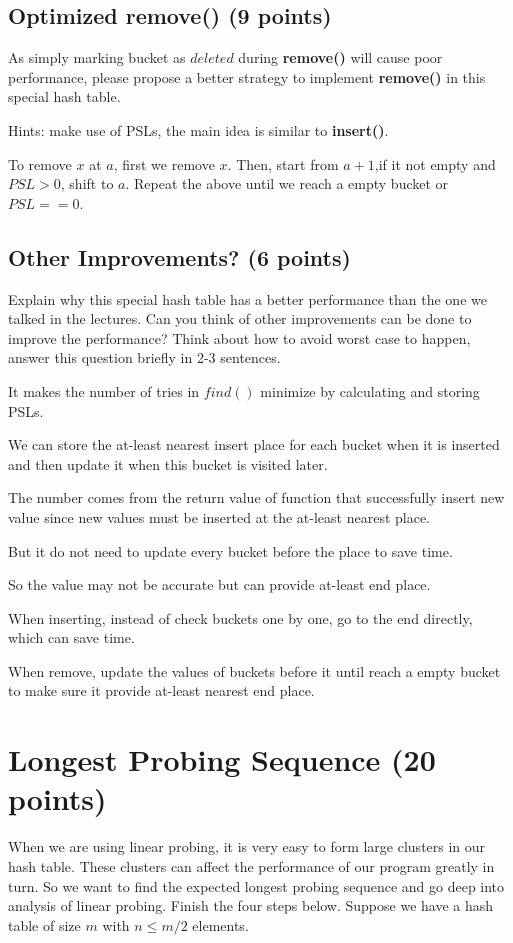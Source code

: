 \documentclass[11pt]{exam}
\begin{document}
\subsection{Optimized remove() (9 points)}
As simply marking bucket as $deleted$ during \textbf{remove()} will cause poor performance, please propose a better strategy to implement \textbf{remove()} in this special hash table.

Hints: make use of PSLs, the main idea is similar to \textbf{insert()}.
\begin{solution}
    To remove $x$ at $a$, first we remove $x$. Then, start from $a+1$,if it not empty and $PSL>0$, shift to $a$. Repeat the above until we reach a empty bucket or $PSL==0$.
\end{solution}

\subsection{Other Improvements? (6 points)}
Explain why this special hash table has a better performance than the one we talked in the lectures. Can you think of other improvements can be done to improve the performance? Think about how to avoid worst case to happen, answer this question briefly in 2-3 sentences.
\begin{solution}
    It makes the number of tries in $find()$ minimize by calculating and storing PSLs.

    We can store the at-least nearest insert place for each bucket when it is inserted and then update it when this bucket is visited later.

    The number comes from the return value of function that successfully insert new value since new values must be inserted at the at-least nearest place.

    But it do not need to update every bucket before the place to save time.

    So the value may not be accurate but can provide at-least end place.


    When inserting, instead of check buckets one by one, go to the end directly, which can save time.

    When remove, update the values of buckets before it until reach a empty bucket to make sure it provide at-least nearest end place.
\end{solution}

\section{Longest Probing Sequence (20 points)}
When we are using linear probing, it is very easy to form large clusters in our hash table. These clusters can affect the performance of our program greatly in turn. So we want to find the expected longest probing sequence and go deep into analysis of linear probing. Finish the four steps below. Suppose we have a hash table of size $m$ with $n \leq m / 2$ elements.
\end{document}
